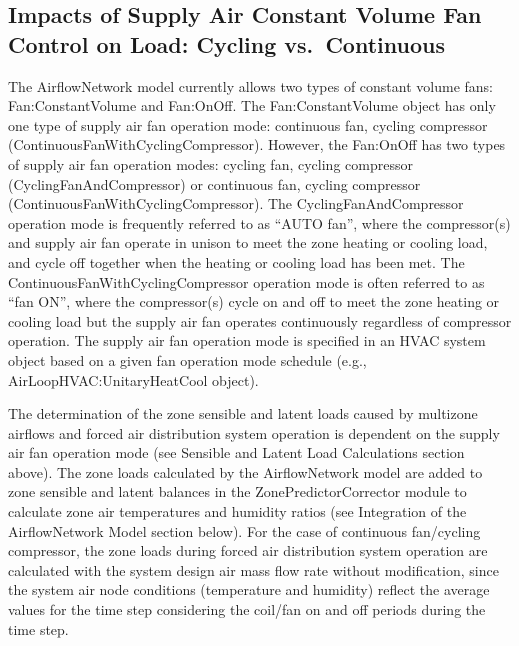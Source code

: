 \subsection{Impacts of Supply Air Constant Volume Fan Control on Load: Cycling vs.~Continuous}\label{impacts-of-supply-air-constant-volume-fan-control-on-load-cycling-vs.continuous}

The AirflowNetwork model currently allows two types of constant volume fans: Fan:ConstantVolume and Fan:OnOff. The Fan:ConstantVolume object has only one type of supply air fan operation mode: continuous fan, cycling compressor (ContinuousFanWithCyclingCompressor). However, the Fan:OnOff has two types of supply air fan operation modes: cycling fan, cycling compressor (CyclingFanAndCompressor) or continuous fan, cycling compressor (ContinuousFanWithCyclingCompressor). The CyclingFanAndCompressor operation mode is frequently referred to as ``AUTO fan'', where the compressor(s) and supply air fan operate in unison to meet the zone heating or cooling load, and cycle off together when the heating or cooling load has been met. The ContinuousFanWithCyclingCompressor operation mode is often referred to as ``fan ON'', where the compressor(s) cycle on and off to meet the zone heating or cooling load but the supply air fan operates continuously regardless of compressor operation. The supply air fan operation mode is specified in an HVAC system object based on a given fan operation mode schedule (e.g., AirLoopHVAC:UnitaryHeatCool object).

The determination of the zone sensible and latent loads caused by multizone airflows and forced air distribution system operation is dependent on the supply air fan operation mode (see Sensible and Latent Load Calculations section above). The zone loads calculated by the AirflowNetwork model are added to zone sensible and latent balances in the ZonePredictorCorrector module to calculate zone air temperatures and humidity ratios (see Integration of the AirflowNetwork Model section below). For the case of continuous fan/cycling compressor, the zone loads during forced air distribution system operation are calculated with the system design air mass flow rate without modification, since the system air node conditions (temperature and humidity) reflect the average values for the time step considering the coil/fan on and off periods during the time step.

